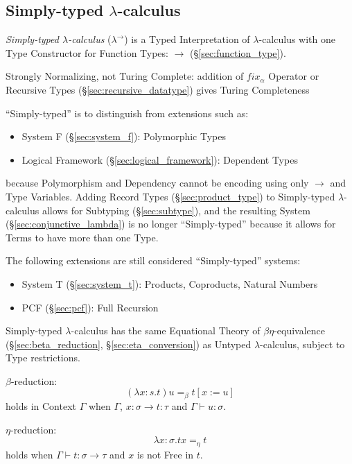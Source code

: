 \subsection{Simply-typed $\lambda$-calculus}\label{sec:simply_typed}

\emph{Simply-typed $\lambda$-calculus} ($\lambda^\rightarrow$) is a
Typed Interpretation of $\lambda$-calculus with one Type Constructor
for Function Types: $\rightarrow$ (\S\ref{sec:function_type}).

Strongly Normalizing, not Turing Complete: addition of $fix_\alpha$
Operator or Recursive Types (\S\ref{sec:recursive_datatype}) gives
Turing Completeness

``Simply-typed'' is to distinguish from extensions such as:
\begin{itemize}
  \item System F (\S\ref{sec:system_f}): Polymorphic Types
  \item Logical Framework (\S\ref{sec:logical_framework}): Dependent
    Types
\end{itemize}
because Polymorphism and Dependency cannot be encoding using only
$\rightarrow$ and Type Variables. Adding Record Types
(\S\ref{sec:product_type}) to Simply-typed $\lambda$-calculus allows
for Subtyping (\S\ref{sec:subtype}), and the resulting System
(\S\ref{sec:conjunctive_lambda}) is no longer ``Simply-typed'' because
it allows for Terms to have more than one Type.

The following extensions are still considered ``Simply-typed''
systems:
\begin{itemize}
  \item System T (\S\ref{sec:system_t}): Products, Coproducts, Natural
    Numbers
  \item PCF (\S\ref{sec:pcf}): Full Recursion
\end{itemize}

Simply-typed $\lambda$-calculus has the same Equational Theory of
$\beta\eta$-equivalence (\S\ref{sec:beta_reduction},
\S\ref{sec:eta_conversion}) as Untyped $\lambda$-calculus, subject to
Type restrictions.

$\beta$-reduction:
\[
  (\lambda x:s.t)u =_\beta t[x := u]
\]
holds in Context $\Gamma$ when $\Gamma$, $x:\sigma \rightarrow t:\tau$
and $\Gamma \vdash u:\sigma$.

$\eta$-reduction:
\[
  \lambda x:\sigma .t x =_\eta t
\]
holds when $\Gamma \vdash t : \sigma \rightarrow \tau$ and $x$ is not
Free in $t$.

